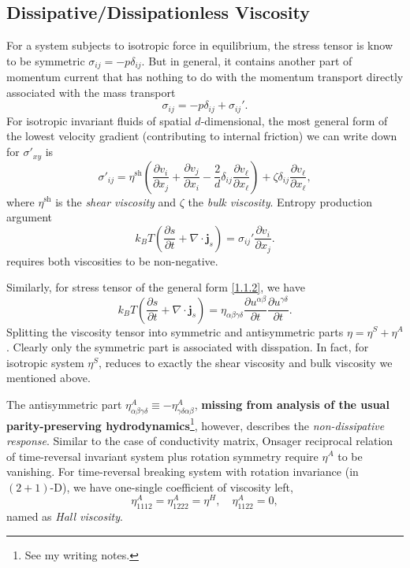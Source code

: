 \documentclass[10pt,nofootinbib,letterpaper]{revtex4}
\begin{document}
	\subsection{Dissipative/Dissipationless Viscosity}
		For a system subjects to isotropic force in equilibrium, the stress tensor is know to be symmetric $\sigma_{ij}=-p\delta_{ij}$. But in general, it contains another part of momentum current that has nothing to do with the momentum transport directly associated with the mass transport \cite{landau1995fluid}
		\begin{equation}\label{1.2.1}
			\sigma_{ij}=-p\delta_{ij}+\sigma_{ij}'.
		\end{equation}
		For isotropic invariant fluids of spatial $d$-dimensional, the most general form of the lowest velocity gradient (contributing to internal friction) we can write down for $\sigma'_{xy}$ is
		\begin{equation}\label{1.2.2}
			\sigma'_{ij}=\eta^{\text{sh}}\left(\dfrac{\partial v_i}{\partial x_j}+\dfrac{\partial v_j}{\partial x_i}-\dfrac{2}{d}\delta_{ij}\dfrac{\partial v_\ell}{\partial x_\ell}\right)+\zeta\delta_{ij}\dfrac{\partial v_\ell}{\partial x_\ell},
		\end{equation}
		where $\eta^{\text{sh}}$ is the \emph{shear viscosity} and $\zeta$ the \emph{bulk viscosity}. Entropy production argument\cite{landau1995fluid}
		\begin{equation}\label{1.2.3}
			k_B T\left(\dfrac{\partial s}{\partial t}+\nabla\cdot \bm{j}_s\right)=\sigma_{ij}'\dfrac{\partial v_i}{\partial x_j}.
		\end{equation}
		requires both viscosities to be non-negative.\par
		Similarly, for stress tensor of the general form \eqref{1.1.2}, we have
		\begin{equation}\label{1.2.4}
			k_B T\left(\dfrac{\partial s}{\partial t}+\nabla\cdot \bm{j}_s\right)=\eta_{\alpha\beta\gamma\delta}\dfrac{\partial u^{\alpha\beta}}{\partial t}\dfrac{\partial u^{\gamma\delta}}{\partial t}.
		\end{equation}
		Splitting the viscosity tensor into symmetric and antisymmetric parts $\eta=\eta^S+\eta^A$. Clearly only the symmetric part is associated with disspation. In fact, for isotropic system $\eta^S$, reduces to exactly the shear viscosity and bulk viscosity we mentioned above.\par
		The antisymmetric part $\eta^A_{\alpha\beta\gamma\delta}\equiv-\eta^A_{\gamma\delta\alpha\beta}$, \textbf{missing from analysis of the usual parity-preserving hydrodynamics}\footnote{See my writing notes.}, however, describes the \emph{non-dissipative response}. Similar to the case of conductivity matrix, Onsager reciprocal relation of time-reversal invariant system plus rotation symmetry require $\eta^A$ to be vanishing. For time-reversal breaking system with rotation invariance (in $(2+1)$-D), we have one-single coefficient of viscosity left,
		\begin{equation}\label{1.2.5}
			\eta^A_{1112}=\eta^A_{1222}=\eta^H,\quad\eta^A_{1122}=0,
		\end{equation}
		 named as \emph{Hall viscosity}.
\end{document}
